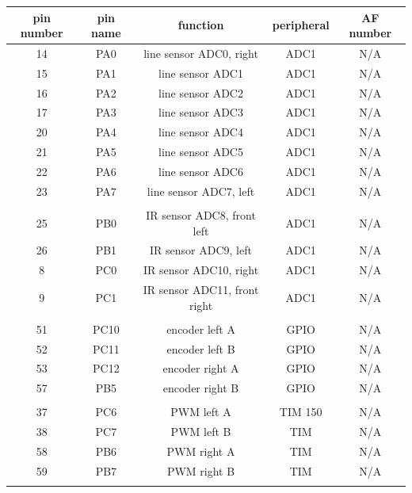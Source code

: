 \documentclass[12pt,twoside,onecolumn,openany,extrafontsizes,dvipsnames]{memoir}
\begin{document}
    \begin{table}[h!]
        \centering
            \begin{tabular}{||c c c c c||} 
            \hline
            pin number & pin name & function & peripheral & AF number \\
            \hline\hline
                14 & PA0 & line sensor ADC0, right & ADC1 & N/A \\ 
                15 & PA1 & line sensor ADC1 & ADC1 & N/A \\ 
                16 & PA2 & line sensor ADC2 & ADC1 & N/A \\ 
                17 & PA3 & line sensor ADC3 & ADC1 & N/A \\ 
                20 & PA4 & line sensor ADC4 & ADC1 & N/A \\ 
                21 & PA5 & line sensor ADC5 & ADC1 & N/A \\ 
                22 & PA6 & line sensor ADC6 & ADC1 & N/A \\ 
                23 & PA7 & line sensor ADC7, left & ADC1 & N/A \\ 
                & & & & \\
                25 & PB0 & IR sensor ADC8, front left  & ADC1 & N/A \\ 
                26 & PB1 & IR sensor ADC9, left & ADC1 & N/A \\ 
                8 & PC0 & IR sensor ADC10, right & ADC1 & N/A \\ 
                9 & PC1 & IR sensor ADC11, front right & ADC1 & N/A \\ 
                & & & & \\
                51 & PC10 & encoder left A  & GPIO & N/A \\ 
                52 & PC11 & encoder left B  & GPIO & N/A \\ 
                53 & PC12 & encoder right A  & GPIO & N/A \\ 
                57 & PB5  & encoder right B  & GPIO & N/A \\ 
                & & & & \\
                37 & PC6 & PWM left A   & TIM 150 & N/A \\ 
                38 & PC7 & PWM left B   & TIM & N/A \\ 
                58 & PB6 & PWM right A  & TIM & N/A \\ 
                59 & PB7 & PWM right B  & TIM & N/A \\ 
                & & & & \\

\end{tabular}
\end{table}
\end{document}
